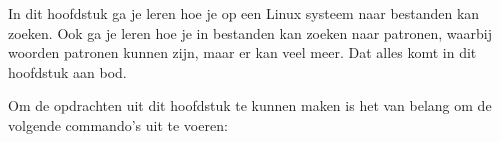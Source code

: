In dit hoofdstuk ga je leren hoe je op een Linux systeem naar bestanden kan zoeken. Ook ga je leren hoe je in bestanden kan zoeken naar patronen, waarbij woorden patronen kunnen zijn, maar er kan veel meer. Dat alles komt in dit hoofdstuk aan bod.

Om de opdrachten uit dit hoofdstuk te kunnen maken is het van belang om de volgende commando's uit te voeren:


